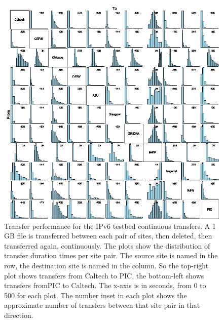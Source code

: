 \begin{figure}[htp]
\centering
\includegraphics{full-mesh}
\caption{Transfer performance for the IPv6 testbed continuous transfers. A 1 GB file is transferred between each pair of sites, then deleted, then transferred again, continuously. The plots show the distribution of transfer duration times per site pair. The source site is named in the row, the destination site is named in the column. So the top-right plot shows transfers from Caltech to PIC, the bottom-left shows transfers fromPIC to Caltech. The x-axis is in seconds, from 0 to 500 for each plot. The number inset in each plot shows the approximate number of transfers between that site pair in that direction.}\label{fig:full-mesh}
\end{figure}


